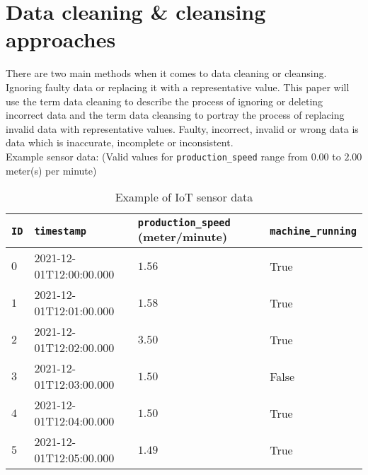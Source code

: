 \chapter{Data cleaning \& cleansing approaches}
There are two main methods when it comes to data cleaning or cleansing. Ignoring faulty data or replacing it with a representative value. This paper will use the term data cleaning to describe the process of ignoring or deleting incorrect data and the term data cleansing to portray the process of replacing invalid data with representative values. Faulty, incorrect, invalid or wrong data is data which is inaccurate, incomplete or inconsistent.\\
Example sensor data: (Valid values for \verb|production_speed| range from $0.00$ to $2.00$ meter(s) per minute)
\begin{table}[ht]
\begin{tabular}{|l|l|l|l|}
\hline
\verb|ID| & \verb|timestamp|        & \verb|production_speed| (meter/minute) & \verb|machine_running| \\ \hline
$0$       & 2021-12-01T12:00:00.000 & $1.56$                                 & True                   \\ \hline
$1$       & 2021-12-01T12:01:00.000 & $1.58$                                 & True                   \\ \hline
$2$       & 2021-12-01T12:02:00.000 & $3.50$                                 & True                   \\ \hline
$3$       & 2021-12-01T12:03:00.000 & $1.50$                                 & False                  \\ \hline
$4$       & 2021-12-01T12:04:00.000 & $1.50$                                 & True                   \\ \hline
$5$       & 2021-12-01T12:05:00.000 & $1.49$                                 & True                   \\ \hline
\end{tabular}
\caption{Example of IoT sensor data}
\label{table:example-iot-data}
\end{table}
